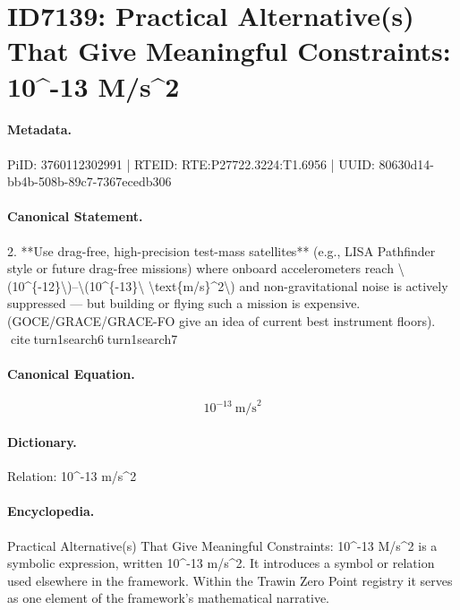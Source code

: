 \section*{ID7139: Practical Alternative(s) That Give Meaningful Constraints: 10\textasciicircum{}-13 M/s\textasciicircum{}2}
\paragraph{Metadata.}
PiID: 3760112302991 | RTEID: RTE:P27722.3224:T1.6956 | UUID: 80630d14-bb4b-508b-89c7-7367ecedb306

\paragraph{Canonical Statement.}
2. **Use drag-free, high-precision test-mass satellites** (e.g., LISA Pathfinder style or future drag-free missions) where onboard accelerometers reach \textbackslash{}(10\textasciicircum{}\{-12\}\textbackslash{})–\textbackslash{}(10\textasciicircum{}\{-13\}\textbackslash{} \textbackslash{}text\{m/s\}\textasciicircum{}2\textbackslash{}) and non-gravitational noise is actively suppressed — but building or flying such a mission is expensive. (GOCE/GRACE/GRACE-FO give an idea of current best instrument floors). citeturn1search6turn1search7

\paragraph{Canonical Equation.}
\[
10^{-13}\ \text{m/s}^2
\]

\paragraph{Dictionary.}
Relation: 10\textasciicircum{}-13 m/s\textasciicircum{}2

\paragraph{Encyclopedia.}
Practical Alternative(s) That Give Meaningful Constraints: 10\textasciicircum{}-13 M/s\textasciicircum{}2 is a symbolic expression, written 10\textasciicircum{}-13 m/s\textasciicircum{}2. It introduces a symbol or relation used elsewhere in the framework. Within the Trawin Zero Point registry it serves as one element of the framework's mathematical narrative.
